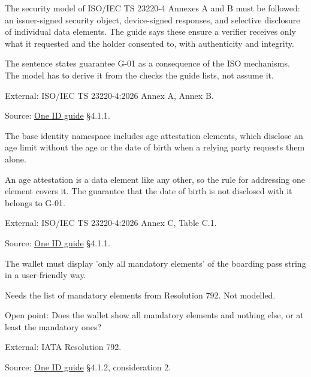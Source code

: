 
\begin{definition}
  \label{def:c26}
  The security model of ISO/IEC TS 23220-4 Annexes A and B must be followed:
  an issuer-signed security object, device-signed responses, and selective
  disclosure of individual data elements. The guide says these ensure a
  verifier receives only what it requested and the holder consented to, with
  authenticity and integrity.

  The sentence states guarantee G-01 as a consequence of the ISO mechanisms.
  The model has to derive it from the checks the guide lists, not assume it.

  External: ISO/IEC TS 23220-4:2026 Annex A, Annex B.

  Source:
  \href{https://standards.atlassian.net/wiki/spaces/OneID/pages/2947416082/Technical+Implementation+Guide}{One
  ID guide} §4.1.1.
\end{definition}

\begin{definition}
  \label{def:c31}
  The base identity namespace includes age attestation elements, which
  disclose an age limit without the age or the date of birth when a relying
  party requests them alone.

  An age attestation is a data element like any other, so the rule for
  addressing one element covers it. The guarantee that the date of birth is
  not disclosed with it belongs to G-01.

  External: ISO/IEC TS 23220-4:2026 Annex C, Table C.1.

  Source:
  \href{https://standards.atlassian.net/wiki/spaces/OneID/pages/2947416082/Technical+Implementation+Guide}{One
  ID guide} §4.1.1.
\end{definition}

\begin{definition}
  \label{def:c39}
  \notready
  The wallet must display 'only all mandatory elements' of the boarding pass
  string in a user-friendly way.

  Needs the list of mandatory elements from Resolution 792. Not modelled.

  Open point: Does the wallet show all mandatory elements and nothing else,
  or at least the mandatory ones?

  External: IATA Resolution 792.

  Source:
  \href{https://standards.atlassian.net/wiki/spaces/OneID/pages/2947416082/Technical+Implementation+Guide}{One
  ID guide} §4.1.2, consideration 2.
\end{definition}

